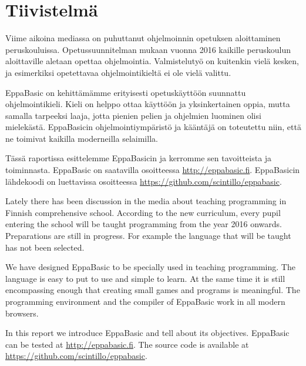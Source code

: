 
\section*{Tiivistelmä}
Viime aikoina mediassa on puhuttanut
ohjelmoinnin opetuksen aloittaminen
peruskouluissa.
Opetussuunnitelman mukaan vuonna
2016 kaikille peruskoulun aloittaville
aletaan opettaa ohjelmointia.
Valmistelutyö on kuitenkin vielä kesken,
ja esimerkiksi opetettavaa
ohjelmointikieltä ei ole vielä valittu.

EppaBasic on kehittämämme erityisesti
opetuskäyttöön suunnattu
ohjelmointikieli.
Kieli on helppo ottaa käyttöön
ja yksinkertainen oppia,
mutta samalla tarpeeksi laaja,
jotta pienien pelien ja ohjelmien
luominen olisi mielekästä.
EppaBasicin ohjelmointiympäristö ja kääntäjä
on toteutettu niin, että ne toimivat
kaikilla moderneilla selaimilla.

Tässä raportissa esittelemme EppaBasicin
ja kerromme sen tavoitteista ja toiminnasta.
EppaBasic on saatavilla osoitteessa \url{http://eppabasic.fi}.
EppaBasicin lähdekoodi on luettavissa
osoitteessa \url{https://github.com/scintillo/eppabasic}.

\vspace{50px}

Lately there has been discussion
in the media
about teaching programming in
Finnish comprehensive school.
According to the new curriculum,
every pupil entering the school
will be taught programming
from the year 2016 onwards.
Preparations are still in progress.
For example the language that
will be taught
has not been selected.

We have designed EppaBasic to be
specially used in teaching programming.
The language is easy to put to use
and simple to learn.
At the same time it is still
encompassing enough that
creating small games and programs
is meaningful.
The programming environment
and the compiler of EppaBasic
work in all modern browsers.

In this report we introduce EppaBasic
and tell about its objectives.
EppaBasic can be tested at
\url{http://eppabasic.fi}.
The source code is available at
\url{https://github.com/scintillo/eppabasic}.